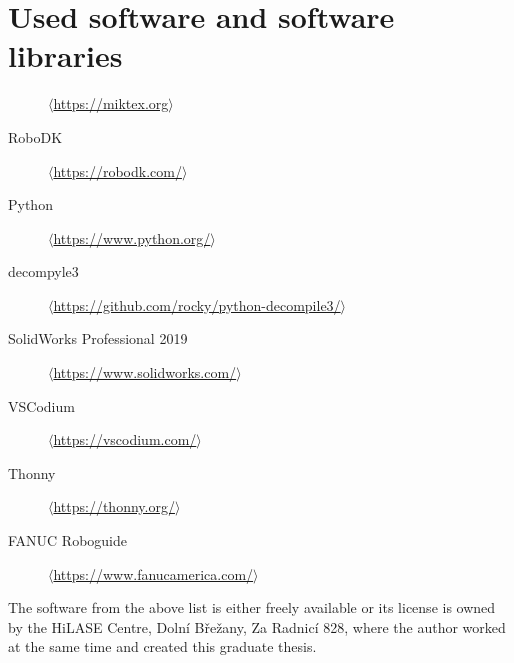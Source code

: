 ﻿\chapter{Used software and software libraries \label{ch:ApendSW}}



\begin{description}
    \item[\LaTeXe]
            \href{https://miktex.org/}
            {$\langle$https://miktex.org$\rangle$}
            
    \item[RoboDK]
            \href{https://robodk.com/}
            {$\langle$https://robodk.com/$\rangle$}
            
    \item[Python]
            \href{https://www.python.org/}
            {$\langle$https://www.python.org/$\rangle$}
    
    \item[decompyle3]
            \href{https://github.com/rocky/python-decompile3/}
            {$\langle$https://github.com/rocky/python-decompile3/$\rangle$}
            
    \item[SolidWorks Professional 2019]
            \href{https://www.solidworks.com/}
            {$\langle$https://www.solidworks.com/$\rangle$}
            
    \item[VSCodium]
            \href{https://vscodium.com/}
            {$\langle$https://vscodium.com/$\rangle$}
            
    \item[Thonny]
            \href{https://thonny.org/}
            {$\langle$https://thonny.org/$\rangle$}
            
    \item[FANUC Roboguide]
            \href{https://www.fanucamerica.com/products/robots/robot-simulation-software-FANUC-ROBOGUIDE}
            {$\langle$https://www.fanucamerica.com/$\rangle$}
\end{description}

The software from the above list is either freely available or its license is owned by the HiLASE Centre, Dolní Břežany, Za Radnicí 828, where the author worked at the same time and created this graduate thesis.



